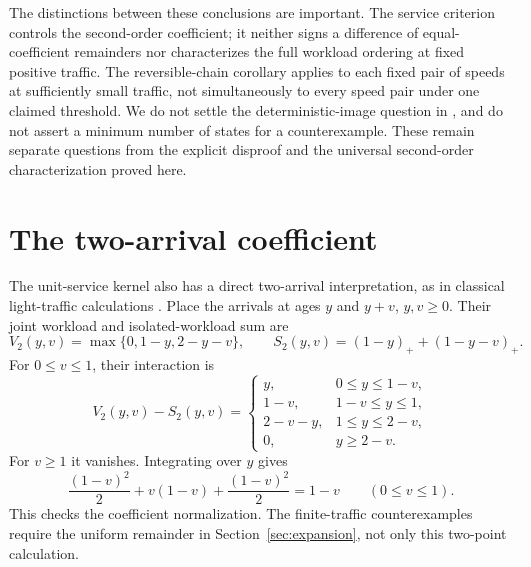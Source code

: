 \documentclass[11pt,reqno]{amsart}
\numberwithin{equation}{section}
\theoremstyle{plain}
\theoremstyle{definition}
\newcommand{\1}{\mathbf 1}
\begin{document}
The distinctions between these conclusions are important. The service criterion controls the second-order coefficient; it neither signs a difference of equal-coefficient remainders nor characterizes the full workload ordering at fixed positive traffic. The reversible-chain corollary applies to each fixed pair of speeds at sufficiently small traffic, not simultaneously to every speed pair under one claimed threshold. We do not settle the deterministic-image question in \cite[Problem~2]{Leskela22}, and do not assert a minimum number of states for a counterexample. These remain separate questions from the explicit disproof and the universal second-order characterization proved here.

\appendix
\section{The two-arrival coefficient}\label{app:pairs}
The unit-service kernel also has a direct two-arrival interpretation, as in classical light-traffic calculations \cite{RS89,Blasz95}. Place the arrivals at ages $y$ and $y+v$, $y,v\ge0$. Their joint workload and isolated-workload sum are
\[
 V_2(y,v)=\max\{0,1-y,2-y-v\},\qquad
 S_2(y,v)=(1-y)_++(1-y-v)_+.
\]
For $0\le v\le1$, their interaction is
\[
 V_2(y,v)-S_2(y,v)=
 \begin{cases}
 y,&0\le y\le1-v,\\
 1-v,&1-v\le y\le1,\\
 2-v-y,&1\le y\le2-v,\\
 0,&y\ge2-v.
 \end{cases}
\]
For $v\ge1$ it vanishes. Integrating over $y$ gives
\[
 \frac{(1-v)^2}{2}+v(1-v)+\frac{(1-v)^2}{2}=1-v
 \qquad(0\le v\le1).
\]
This checks the coefficient normalization. The finite-traffic counterexamples require the uniform remainder in Section~\ref{sec:expansion}, not only this two-point calculation.
\end{document}

